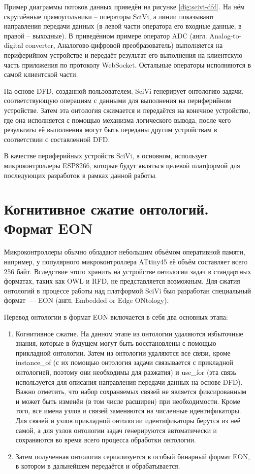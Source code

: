 Пример диаграммы потоков данных приведён на рисунке \ref{dig:scivi-dfd}.
На нём скруглённые прямоугольники -- операторы SciVi, а линии показывают направления передачи данных (в левой части оператора его входные данные, в правой -- выходные).
В приведённом примере оператор ADC (англ. Analog-to-digital converter, Аналогово-цифровой преобразователь) выполняется на периферийном устройстве и передаёт результат его выполнения на клиентскую часть приложения по протоколу WebSocket.
Остальные операторы исполняются в самой клиентской части.


На основе DFD, созданной пользователем, SciVi генерирует онтологию задачи, соответствующую операциям с данными для выполнения на периферийном устройстве.
Затем эта онтология сжимается и передаётся на конечное устройство, где она исполняется с помощью механизма логического вывода, после чего результаты её выполнения могут быть переданы другим устройствам в соответствии с составленной DFD.

В качестве периферийных устройств SciVi, в основном, использует микроконтроллеры ESP8266, которые будут являться целевой платформой для последующих разработок в рамках данной работы.

\section{Когнитивное сжатие онтологий. Формат EON}

Микроконтроллеры обычно обладают небольшим объёмом оперативной памяти, например, у популярного микроконтроллера ATtiny45 её объём составляет всего 256 байт.
Вследствие этого хранить на устройстве онтологии задач в стандартных форматах, таких как OWL и RFD, не представляется возможным.
Для сжатия онтологий в процессе работы над платформой SciVi был разработан специальный формат~--- EON (англ. Embedded or Edge ONtology).

Перевод онтологии в формат EON включается в себя два основных этапа:
\begin{enumerate}
	\item Когнитивное сжатие.
	На данном этапе из онтологии удаляются избыточные знания, которые в будущем могут быть восстановлены с помощью прикладной онтологии.
	Затем из онтологии удаляются все связи, кроме instance{\_}of (с их помощью онтология задачи связывается с прикладной онтологией, поэтому они необходимы для разжатия) и use{\_}for (эта связь используется для описания направления передачи данных на основе DFD).
	Важно отметить, что набор сохраняемых связей не является фиксированным и может быть изменён (в том числе расширен) при необходимости.
	Кроме того, все имена узлов и связей заменяются на численные идентификаторы.
	Для связей и узлов прикладной онтологии идентификаторы берутся из неё самой, а для узлов онтологии задач генерируются автоматически и сохраняются во время всего процесса обработки онтологии.
	\item Затем полученная онтология сериализуется в особый бинарный формат EON, в котором в дальнейшем передаётся и обрабатывается.
\end{enumerate}

